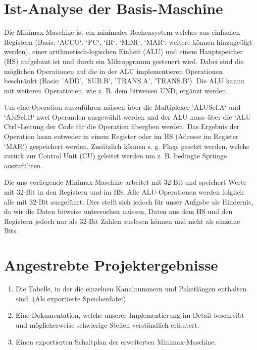 \documentclass[12pt,titlepage]{article}
\begin{document}
\section{Ist-Analyse der Basis-Maschine}

Die Minimax-Maschine ist ein minimales Rechensystem welches aus einfachen Registern (Basis: `ACCU`, `PC`, `IR`, `MDR`, `MAR`;
weitere k{\"o}nnen hinzuge{\"u}fgt werden), einer arithmetisch-logischen Einheit (ALU) und einem Hauptspeicher (HS) aufgebaut
ist und durch ein Mikropgramm gesteuert wird. Dabei sind die m{\"o}glichen Operationen auf die in der ALU implementieren
Operationen beschr{\"a}nkt (Basis: 'ADD', 'SUB.B', 'TRANS.A', 'TRANS.B'). Die ALU kannn mit weiteren Operationen,
wie z. B. dem bitweisen UND, erg{\"a}nzt werden.


Um eine Operation auszuf{\"u}hren m{\"u}ssen {\"u}ber die Multiplexer `ALUSel.A` und `AluSel.B` zwei Operanden ausgew{\"a}hlt werden
und der ALU muss {\"u}ber die `ALU Ctrl`-Leitung der Code f{\"u}r die Operation {\"u}bergben werden. Das Ergebnis der Operation kann
entweder in einem Register oder im HS (Adresse im Register `MAR`) gespeichert werden. Zus{\"a}tzlich k{\"o}nnen s. g. Flags 
gesetzt werden, welche zur{\"u}ck zur Control Unit (CU) geleitet werden um z. B. bedingte Spr{\"u}nge auszuf{\"u}hren.


Die uns vorliegende Minimax-Maschine arbeitet mit 32-Bit und speichert Werte mit 32-Bit in den Registern und im HS.
Alle ALU-Operationen werden folglich alle mit 32-Bit ausgef{\"u}hrt. Dies stellt sich jedoch f{\"u}r unser Aufgabe als
Hindernis, da wir die Daten bitweise untersuchen m{\"u}ssen, Daten aus dem HS und den Registern jedoch nur als
32-Bit Zahlen auslesen k{\"o}nnen und nicht als einzelne Bits.

\section{Angestrebte Projektergebnisse}
\begin{enumerate}
\item Die Tabelle, in der die einzelnen Kanalnummern und Paketl{\"a}ngen enthalten sind. (Als exportierte Speicherdatei)
\item Eine Dokumentation, welche unserer Implementierung im Detail beschreibt und m{\"o}glicherweise schwierige Stellen verst{\"a}ndlich erl{\"a}utert.
\item Einen exportierten Schaltplan der erweiterten Minimax-Maschine.
\end{enumerate}
\end{document}
